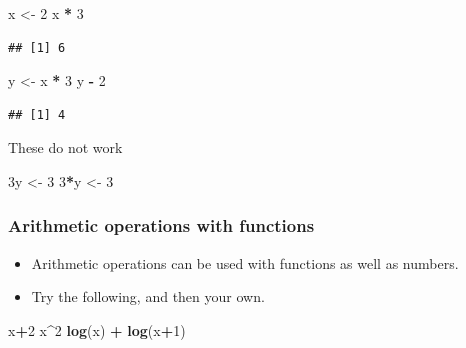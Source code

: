 \documentclass[]{book}
\newenvironment{Shaded}{\begin{snugshade}}{\end{snugshade}}
\newcommand{\DecValTok}[1]{\textcolor[rgb]{0.00,0.00,0.81}{#1}}
\newcommand{\KeywordTok}[1]{\textcolor[rgb]{0.13,0.29,0.53}{\textbf{#1}}}
\newcommand{\NormalTok}[1]{#1}
\newcommand{\OperatorTok}[1]{\textcolor[rgb]{0.81,0.36,0.00}{\textbf{#1}}}
\newcommand{\StringTok}[1]{\textcolor[rgb]{0.31,0.60,0.02}{#1}}
\begin{document}
\begin{Shaded}
\begin{Highlighting}[]
\NormalTok{x <-}\StringTok{ }\DecValTok{2}
\NormalTok{x }\OperatorTok{*}\StringTok{ }\DecValTok{3}
\end{Highlighting}
\end{Shaded}

\begin{verbatim}
## [1] 6
\end{verbatim}

\begin{Shaded}
\begin{Highlighting}[]
\NormalTok{y <-}\StringTok{ }\NormalTok{x }\OperatorTok{*}\StringTok{ }\DecValTok{3}
\NormalTok{y }\OperatorTok{-}\StringTok{ }\DecValTok{2}
\end{Highlighting}
\end{Shaded}

\begin{verbatim}
## [1] 4
\end{verbatim}

These do not work

\begin{Shaded}
\begin{Highlighting}[]
\NormalTok{3y <-}\StringTok{ }\DecValTok{3}
\DecValTok{3}\OperatorTok{*}\NormalTok{y <-}\StringTok{ }\DecValTok{3}
\end{Highlighting}
\end{Shaded}

\hypertarget{arithmetic-operations-with-functions}{%
\subsubsection{Arithmetic operations with functions}\label{arithmetic-operations-with-functions}}

\begin{itemize}
\item
  Arithmetic operations can be used with functions as well as numbers.
\item
  Try the following, and then your own.
\end{itemize}

\begin{Shaded}
\begin{Highlighting}[]
\NormalTok{x}\OperatorTok{+}\DecValTok{2}
\NormalTok{x}\OperatorTok{^}\DecValTok{2}
\KeywordTok{log}\NormalTok{(x) }\OperatorTok{+}\StringTok{ }\KeywordTok{log}\NormalTok{(x}\OperatorTok{+}\DecValTok{1}\NormalTok{)}
\end{Highlighting}
\end{Shaded}
\end{document}
